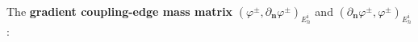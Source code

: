 \documentclass{mc2013}
\newcommand\bs{\boldsymbol}
\newcommand\tf{\varphi}
\renewcommand{\(}{\left(}
\renewcommand{\)}{\right)}
\renewcommand{\[}{\left[}
\renewcommand{\]}{\right]}
\begin{document}
\begin{itemize}
\end{itemize}
The {\bf gradient coupling-edge mass matrix}
$(\tf^{\pm},\partial_{\bs{n}}\tf^{\pm})_{E_h^i}$ and
$(\partial_{\bs{n}}\tf^{\pm},\tf^{\pm})_{E_h^i}$ :
\end{document}
